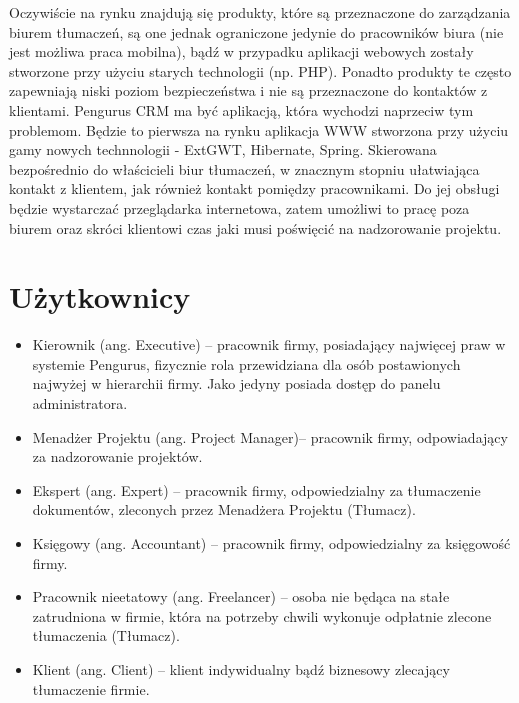 \documentclass[licencjacka]{pracamgr}
\begin{document}
Oczywiście na rynku znajdują się produkty, które są przeznaczone do zarządzania biurem tłumaczeń, 
są one jednak ograniczone jedynie do pracowników biura (nie jest możliwa praca mobilna),
bądź w przypadku aplikacji webowych zostały stworzone przy użyciu starych technologii (np. PHP). 
Ponadto produkty te często zapewniają niski poziom bezpieczeństwa i nie są przeznaczone do kontaktów z klientami.
Pengurus CRM ma być aplikacją, która wychodzi naprzeciw tym problemom. 
Będzie to pierwsza na rynku aplikacja WWW stworzona przy użyciu gamy nowych technnologii - ExtGWT, Hibernate, Spring.
Skierowana bezpośrednio do właścicieli biur tłumaczeń, w znacznym stopniu ułatwiająca kontakt z klientem, jak również kontakt pomiędzy pracownikami. 
Do jej obsługi będzie wystarczać przeglądarka internetowa, zatem umożliwi to pracę poza biurem
oraz skróci klientowi czas jaki musi poświęcić na nadzorowanie projektu. 

\section{Użytkownicy}
\begin{itemize}
\item Kierownik (ang. Executive) – pracownik firmy, posiadający najwięcej praw w systemie Pengurus, fizycznie rola przewidziana dla osób postawionych najwyżej w hierarchii firmy. Jako jedyny posiada dostęp do panelu administratora.
\item Menadżer Projektu (ang. Project Manager)– pracownik firmy, odpowiadający za nadzorowanie projektów.
\item Ekspert (ang. Expert) – pracownik firmy, odpowiedzialny za tłumaczenie dokumentów, zleconych przez Menadżera Projektu (Tłumacz).
\item Księgowy (ang. Accountant) – pracownik firmy, odpowiedzialny za księgowość firmy.
\item Pracownik nieetatowy (ang. Freelancer) – osoba nie będąca na stałe zatrudniona w firmie, która na potrzeby chwili wykonuje odpłatnie zlecone tłumaczenia (Tłumacz).
\item Klient (ang. Client) – klient indywidualny bądź biznesowy zlecający tłumaczenie firmie.
\end{itemize}
\end{document}

